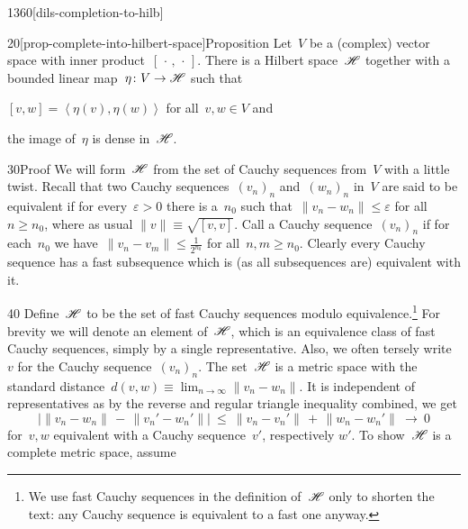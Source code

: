 \begin{parsec}{1360}[dils-completion-to-hilb]
\begin{point}{20}[prop-complete-into-hilbert-space]{Proposition}%
    Let~$V$ be a (complex) vector space with inner
        product~$[\,\cdot\,,\,\cdot\,]$.
    There is a Hilbert space~$\mathscr{H}$
        together with a bounded linear map~$\eta\colon V \to \mathscr{H}$
            such that
        \begin{inparaenum}
        \item
        $[v,w] = \left<\eta(v), \eta(w)\right>$
            for all~$v,w \in V$ and
        \item
        the image of~$\eta$ is dense in~$\mathscr{H}$.
        \end{inparaenum}
\begin{point}{30}{Proof}%
We will form~$\mathscr{H}$ from the set of Cauchy sequences from~$V$
    with a little twist.
Recall that two Cauchy
    sequences~$(v_n)_n$ and~$(w_n)_n$ in~$V$
    are said to be equivalent
    if for every~$\varepsilon > 0$
    there is a~$n_0$
    such that~$\| v_n - w_n \| \leq \varepsilon$
    for all~$n \geq n_0$,
    where as usual $\|v\| \equiv \sqrt{[v,v]}$.
Call a Cauchy sequence~$(v_n)_n$ 
    if for each~$n_0$
    we have~$\| v_n - v_m\| \leq \frac{1}{2^{n_0}}$
    for all~$n,m \geq n_0$.
Clearly every Cauchy sequence has a fast subsequence
    which is (as all subsequences are) equivalent with it.
\begin{point}{40}%
    Define~$\mathscr{H}$ to be the set of fast Cauchy sequences modulo
        equivalence.\footnote{We use fast Cauchy sequences
            in the definition of~$\mathscr{H}$ only to shorten the text:
            any Cauchy sequence is equivalent to a fast one anyway.}
For brevity we will denote an element of~$\mathscr{H}$,
    which is an equivalence class of fast Cauchy sequences, simply by
    a single representative.
Also, we often tersely write~$v$ for the Cauchy sequence~$(v_n)_n$.
The set~$\mathscr{H}$ is a metric space
    with the standard
    distance~$d(v, w) \equiv \lim_{n\to\infty} \| v_n - w_n\|$.
It is independent of representatives
    as by the reverse and regular triangle inequality combined,
     we get
\begin{equation*}
    \bigl| \| v_n - w_n \| \,-\, \| v_n' - w_n' \| \bigr|
        \ \leq \ 
    \| v_n - v_n' \| \,+\, \|w_n - w_n'\| \ \rightarrow \ 0
\end{equation*}
for~$v,w$ equivalent with a Cauchy sequence~$v'$, respectively $w'$.
To show~$\mathscr{H}$ is a complete metric space, assume

\end{point}
\end{point}
\end{point}
\end{parsec}
